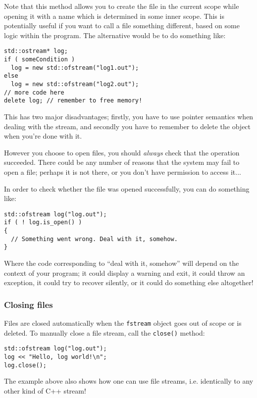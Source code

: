 \documentclass[a4paper]{scrartcl}
\begin{document}
Note that this method allows you to create the file in the current scope while opening it with a name which is determined in some inner scope. This is potentially useful if you want to call a file something different, based on some logic within the program. The alternative would be to do something like:
\begin{verbatim}
std::ostream* log;
if ( someCondition )
  log = new std::ofstream("log1.out");
else
  log = new std::ofstream("log2.out");
// more code here
delete log; // remember to free memory!
\end{verbatim}

This has two major disadvantages; firstly, you have to use pointer semantics when dealing with the stream, and secondly you have to remember to delete the object when you're done with it.

However you choose to open files, you should \emph{always} check that the operation succeeded. There could be any number of reasons that the system may fail to open a file; perhaps it is not there, or you don't have permission to access it...

In order to check whether the file was opened successfully, you can do something like:
\begin{verbatim}
std::ofstream log("log.out");
if ( ! log.is_open() )
{
  // Something went wrong. Deal with it, somehow.
}
\end{verbatim}
Where the code corresponding to ``deal with it, somehow'' will depend on the context of your program; it could display a warning and exit, it could throw an exception, it could try to recover silently, or it could do something else altogether!

\subsubsection{Closing files}
Files are closed automatically when the \verb|fstream| object goes out of scope or is deleted. To manually close a file stream, call the \verb|close()| method:
\begin{verbatim}
std::ofstream log("log.out");
log << "Hello, log world!\n";
log.close();
\end{verbatim}

The example above also shows how one can use file streams, i.e. identically to any other kind of C++ stream!
\end{document}
